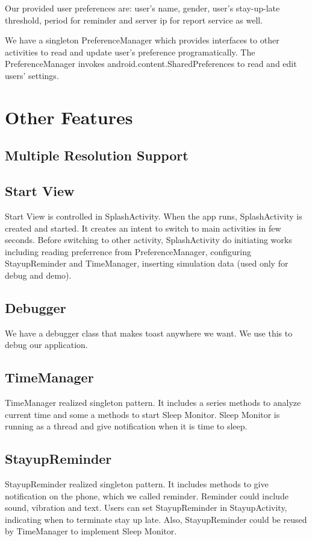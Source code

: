 \documentclass[14pt]{extreport}
\begin{document}
Our provided user preferences are: user's name, gender, user's stay-up-late threshold, period for reminder and server ip for report service as well.

We have a singleton PreferenceManager which provides interfaces to other activities to read and update user's preference programatically. The PreferenceManager invokes android.content.SharedPreferences to read and edit users' settings.

\chapter{Other Features}
\section{Multiple Resolution Support}

\section{Start View}
Start View is controlled in SplashActivity. When the app runs, SplashActivity is created and started. It creates an intent to switch to main activities in few seconds. Before switching to other activity, SplashActivity do initiating works including reading preferrence from PreferenceManager, configuring StayupReminder and TimeManager, inserting simulation data (used only for debug and demo). 

\section{Debugger}
We have a debugger class that makes toast anywhere we want. We use this to debug our application.

\section{TimeManager}
TimeManager realized singleton pattern. It includes a series methods to analyze current time and some a methods to start Sleep Monitor. Sleep Monitor is running as a thread and give notification when it is time to sleep.

\section{StayupReminder}
StayupReminder realized singleton pattern. It includes methods to give notification on the phone, which we called reminder. Reminder could include sound, vibration and text. Users can set StayupReminder in StayupActivity, indicating when to terminate stay up late. Also, StayupReminder could be reused by TimeManager to implement Sleep Monitor.
\end{document}
